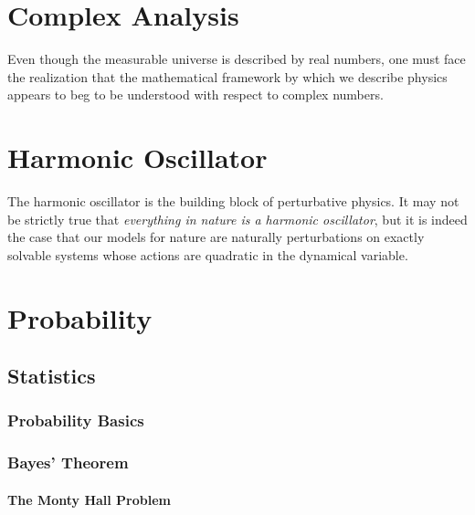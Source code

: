 \documentclass[12pt, oneside]{report}
\let\oldsection\section
\def\section{%
  \setcounter{sidenote}{1}%
  \oldsection
}
\begin{document}



\part{Complex Analysis}

Even though the measurable universe is described by real numbers, one must face the realization that the mathematical framework by which we describe physics appears to beg to be understood with respect to complex numbers. 






\part{Harmonic Oscillator}

The harmonic oscillator is the building block of perturbative physics. It may not be strictly true that \emph{everything in nature is a harmonic oscillator}, but it is indeed the case that our models for nature are naturally perturbations on exactly solvable systems whose actions are quadratic in the dynamical variable.




\part{Probability}





\chapter{Statistics}
  \section{Probability Basics}

  \section{Bayes' Theorem}

    \subsection{The Monty Hall Problem}
\end{document}
